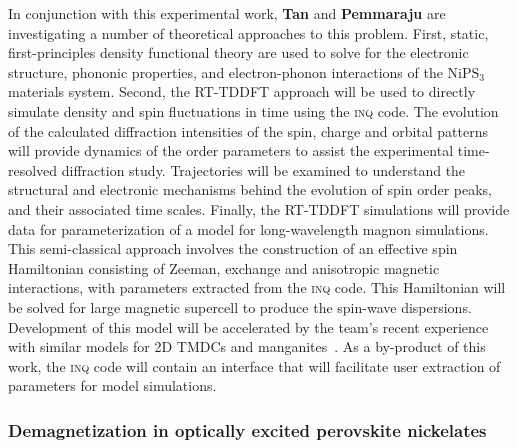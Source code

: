 In conjunction with this experimental work, {\bf Tan} and {\bf Pemmaraju} are investigating a number of theoretical approaches to this problem.
First, static, first-principles density functional theory are used to solve for the electronic structure, phononic properties, and electron-phonon interactions of the \(\mathrm{NiPS_3}\) materials system. 
Second, the RT-TDDFT approach will be used to directly simulate density and spin fluctuations in time using the \textsc{inq} code.
The evolution of the calculated diffraction intensities of the spin, charge and orbital patterns will provide dynamics of the order parameters to assist the experimental time-resolved diffraction study.
Trajectories will be examined to understand the structural and electronic mechanisms behind the evolution of spin order peaks, and their associated time scales. 
Finally, the RT-TDDFT simulations will provide data for parameterization of a model for long-wavelength magnon simulations. 
This semi-classical approach involves the construction of an effective spin Hamiltonian consisting of Zeeman, exchange and anisotropic magnetic interactions, with parameters extracted from the \textsc{inq} code. 
This Hamiltonian will be solved for large magnetic supercell to produce the spin-wave dispersions. 
Development of this model will be accelerated by the team's recent experience with similar models for 2D TMDCs and manganites~\cite{Siddiqui2020, Rajpurohit2020}. 
As a by-product of this work, the \textsc{inq} code will contain an interface that will facilitate user extraction of parameters for model simulations.

\subsubsection{Demagnetization in optically excited perovskite nickelates}

